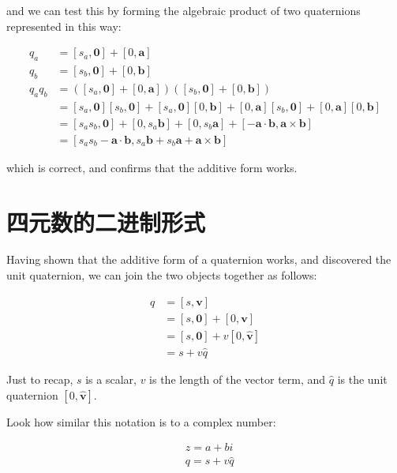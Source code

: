 and we can test this by forming the algebraic product of two quaternions represented in this way:

$$
\begin{aligned}
q_{a} & =\left[s_{a}, \mathbf{0}\right]+[0, \mathbf{a}] \\
q_{b} & =\left[s_{b}, \mathbf{0}\right]+[0, \mathbf{b}] \\
q_{a} q_{b} & =\left(\left[s_{a}, \mathbf{0}\right]+[0, \mathbf{a}]\right)\left(\left[s_{b}, \mathbf{0}\right]+[0, \mathbf{b}]\right) \\
& =\left[s_{a}, \mathbf{0}\right]\left[s_{b}, \mathbf{0}\right]+\left[s_{a}, \mathbf{0}\right][0, \mathbf{b}]+[0, \mathbf{a}]\left[s_{b}, \mathbf{0}\right]+[0, \mathbf{a}][0, \mathbf{b}] \\
& =\left[s_{a} s_{b}, \mathbf{0}\right]+\left[0, s_{a} \mathbf{b}\right]+\left[0, s_{b} \mathbf{a}\right]+[-\mathbf{a} \cdot \mathbf{b}, \mathbf{a} \times \mathbf{b}] \\
& =\left[s_{a} s_{b}-\mathbf{a} \cdot \mathbf{b}, s_{a} \mathbf{b}+s_{b} \mathbf{a}+\mathbf{a} \times \mathbf{b}\right]
\end{aligned}
$$

which is correct, and confirms that the additive form works.

\section{四元数的二进制形式}
Having shown that the additive form of a quaternion works, and discovered the unit quaternion, we can join the two objects together as follows:

$$
\begin{aligned}
q & =[s, \mathbf{v}] \\
& =[s, \mathbf{0}]+[0, \mathbf{v}] \\
& =[s, \mathbf{0}]+v[0, \hat{\mathbf{v}}] \\
& =s+v \hat{q}
\end{aligned}
$$

Just to recap, $s$ is a scalar, $v$ is the length of the vector term, and $\hat{q}$ is the unit quaternion $[0, \hat{\mathbf{v}}]$.

Look how similar this notation is to a complex number:

$$
\begin{aligned}
& z=a+b i \\
& q=s+v \hat{q}
\end{aligned}
$$


